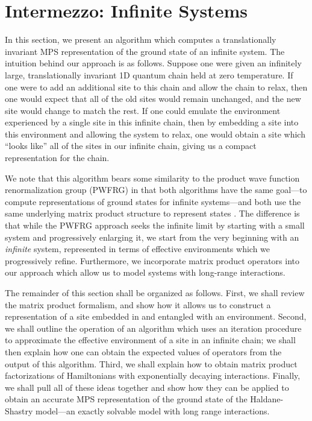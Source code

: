 \documentclass[12pt]{amsbook}
\theoremstyle{plain}
\theoremstyle{definition}
\theoremstyle{remark}
\begin{document}
\section{Intermezzo: Infinite Systems}

In this section, we present an algorithm which computes a translationally invariant MPS representation of the ground state of an infinite system.  The intuition behind our approach is as follows.  Suppose one were given an infinitely large, translationally invariant 1D quantum chain held at zero temperature.  If one were to add an additional site to this chain and allow the chain to relax, then one would expect that all of the old sites would remain unchanged, and the new site would change to match the rest.  If one could emulate the environment experienced by a single site in this infinite chain, then by embedding a site into this environment and allowing the system to relax, one would obtain a site which ``looks like'' all of the sites in our infinite chain, giving us a compact representation for the chain.

We note that this algorithm bears some similarity to the product wave
function renormalization group (PWFRG) \cite{Nishino:1995kx} in that
both algorithms have the same goal---to compute representations of
ground states for infinite systems---and both use the same underlying
matrix product structure to represent states \cite{pwfrg-mps-2}.  The
difference is that while the PWFRG approach seeks the infinite limit
by starting with a small system and progressively enlarging it, we
start from the very beginning with an \emph{infinite} system,
represented in terms of effective environments which we progressively
refine.  Furthermore, we incorporate matrix product operators into our
approach which allow us to model systems with long-range interactions.

The remainder of this section shall be organized as follows.  First, we shall review the matrix product formalism, and show how it allows us to construct a representation of a site embedded in and entangled with an environment.  Second, we shall outline the operation of an algorithm which uses an iteration procedure to approximate the effective environment of a site in an infinite chain;  we shall then explain how one can obtain the expected values of operators from the output of this algorithm.  Third, we shall explain how to obtain matrix product factorizations of Hamiltonians with exponentially decaying interactions.  Finally, we shall pull all of these ideas together and show how they can be applied to obtain an accurate MPS representation of the ground state of the Haldane-Shastry model---an exactly solvable model with long range interactions.
\end{document}
